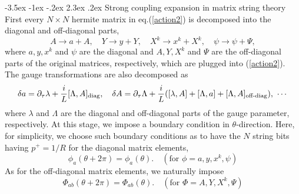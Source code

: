 \documentclass[a4paper,12pt]{article}
\makeatletter
\newcommand{\diag}{\rm diag}
\newcommand{\odiag}{\mbox{\scriptsize off-diag}}
\newcommand{\ptau}{\partial_\tau}
\renewcommand\section{\@startsection {section}{1}{\z@}%
		{-3.5ex \@plus -1ex \@minus -.2ex}%
		{2.3ex \@plus.2ex}%
		{\normalfont\large\bfseries}}
\makeatother
\begin{document}
\section{Strong coupling expansion in matrix string
theory\label{SCEinMST}}
First every $N\times N$ hermite matrix in eq.(\ref{action2}) is
decomposed into the diagonal and off-diagonal parts,
\begin{equation}
 A\to a+A,\quad Y\to y+Y,\quad X^k\to x^k+X^k,
	\quad \psi\to \psi+\Psi,\label{decomp}
\end{equation}
where $a,y,x^k$ and $\psi$ are the diagonal and $A,Y,X^k$ and $\Psi$
are the off-diagonal parts of the original matrices, respectively,
which are plugged into (\ref{action2}).
The gauge transformations are also decomposed as
\begin{equation}
  \delta a=\ptau \lambda +\frac{i}{L}[\Lambda,A]_{\diag},\quad
  \delta A=\ptau  \Lambda + \frac{i}{L}([\lambda,A]+[\Lambda,a]
	+[\Lambda,A]_{\odiag}),~\cdots
\end{equation}
where $\lambda$ and $\Lambda$ are the diagonal and off-diagonal
parts of the gauge parameter, respectively.
At this stage, we impose a boundary condition in $\theta$-direction.
Here, for simplicity, we choose such boundary conditions as
to have the $N$ string bits having $p^+=1/R$ for the diagonal matrix
elements,
\begin{equation}
  \phi_a(\theta +2\pi)=\phi_a(\theta).\quad
	(\mbox{for  } \phi=a,y,x^k,\psi)
\end{equation}
As for the off-diagonal matrix elements, we naturally impose
\begin{equation}
  \Phi_{ab}(\theta +2\pi)=\Phi_{ab}(\theta).\quad
	(\mbox{for  } \Phi=A, Y, X^k, \Psi)
\end{equation}
\end{document}
